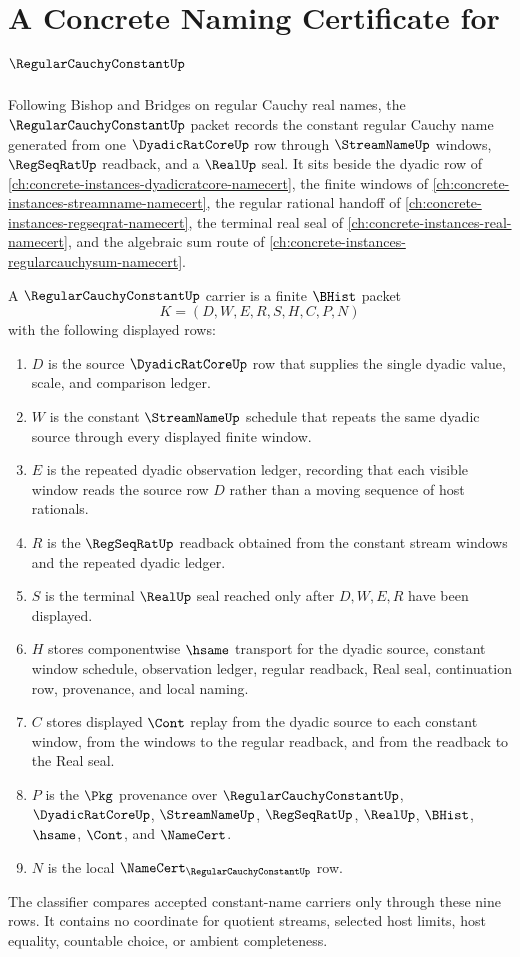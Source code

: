\chapter{A Concrete Naming Certificate for $\RegularCauchyConstantUp$}
\label{ch:concrete-instances-regular-cauchy-constant-namecert}

Following Bishop and Bridges on regular Cauchy real names, the $\RegularCauchyConstantUp$ packet records the constant regular Cauchy name generated from one $\DyadicRatCoreUp$ row through $\StreamNameUp$ windows, $\RegSeqRatUp$ readback, and a $\RealUp$ seal. It sits beside the dyadic row of \autoref{ch:concrete-instances-dyadicratcore-namecert}, the finite windows of \autoref{ch:concrete-instances-streamname-namecert}, the regular rational handoff of \autoref{ch:concrete-instances-regseqrat-namecert}, the terminal real seal of \autoref{ch:concrete-instances-real-namecert}, and the algebraic sum route of \autoref{ch:concrete-instances-regularcauchysum-namecert}.

\begin{definition}
\label{def:regular-cauchy-constant-carrier}
A $\RegularCauchyConstantUp$ carrier is a finite $\BHist$ packet
$$
K=(D,W,E,R,S,H,C,P,N)
$$
with the following displayed rows:
\begin{enumerate}
\item $D$ is the source $\DyadicRatCoreUp$ row that supplies the single dyadic value, scale, and comparison ledger.
\item $W$ is the constant $\StreamNameUp$ schedule that repeats the same dyadic source through every displayed finite window.
\item $E$ is the repeated dyadic observation ledger, recording that each visible window reads the source row $D$ rather than a moving sequence of host rationals.
\item $R$ is the $\RegSeqRatUp$ readback obtained from the constant stream windows and the repeated dyadic ledger.
\item $S$ is the terminal $\RealUp$ seal reached only after $D,W,E,R$ have been displayed.
\item $H$ stores componentwise $\hsame$ transport for the dyadic source, constant window schedule, observation ledger, regular readback, Real seal, continuation row, provenance, and local naming.
\item $C$ stores displayed $\Cont$ replay from the dyadic source to each constant window, from the windows to the regular readback, and from the readback to the Real seal.
\item $P$ is the $\Pkg$ provenance over $\RegularCauchyConstantUp$, $\DyadicRatCoreUp$, $\StreamNameUp$, $\RegSeqRatUp$, $\RealUp$, $\BHist$, $\hsame$, $\Cont$, and $\NameCert$.
\item $N$ is the local $\NameCert_{\RegularCauchyConstantUp}$ row.
\end{enumerate}
The classifier compares accepted constant-name carriers only through these nine rows. It contains no coordinate for quotient streams, selected host limits, host equality, countable choice, or ambient completeness.
\end{definition}

